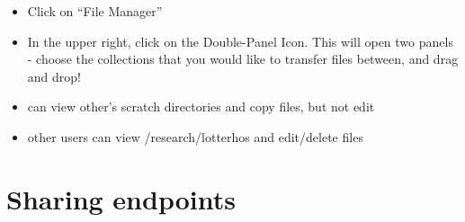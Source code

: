 \documentclass[
  letterpaper,
  DIV=11,
  numbers=noendperiod]{scrreprt}
\begin{document}

\begin{itemize}
\item
  Click on ``File Manager''
\item
  In the upper right, click on the Double-Panel Icon. This will open two
  panels - choose the collections that you would like to transfer files
  between, and drag and drop!
\item
  can view other's scratch directories and copy files, but not edit
\item
  other users can view /research/lotterhos and edit/delete files
\end{itemize}

\hypertarget{sharing-endpoints}{%
\section*{\texorpdfstring{\textbf{Sharing
endpoints}}{Sharing endpoints}}\label{sharing-endpoints}}

\end{document}

